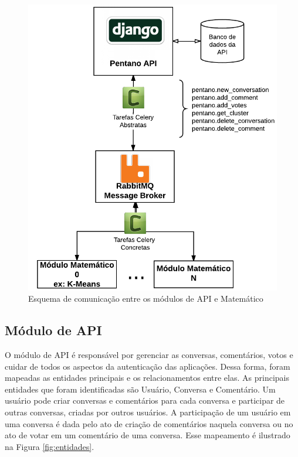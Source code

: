     \begin{figure}[ht!]
    \centering
    \includegraphics[scale=1]{figuras/esquema_protocolo.png}
    \caption{Esquema de comunicação entre os módulos de API e Matemático}
    \label{fig:protocolo}
    \end{figure}
    
    
    \subsection{Módulo de API}

	O módulo de API é responsável por gerenciar as conversas, comentários, votos
	e cuidar de todos os aspectos da autenticação das aplicações. Dessa forma, foram mapeadas as entidades principais e 
	os relacionamentos entre elas. 
	As principais entidades que foram identificadas são Usuário, Conversa e Comentário. Um usuário pode criar
	conversas e comentários para cada conversa e participar de outras conversas, criadas por outros usuários.
	A participação de um usuário em uma conversa é dada pelo ato de criação de comentários naquela conversa ou
	no ato de votar em um comentário de uma conversa. Esse mapeamento é ilustrado na Figura \ref{fig:entidades}.

